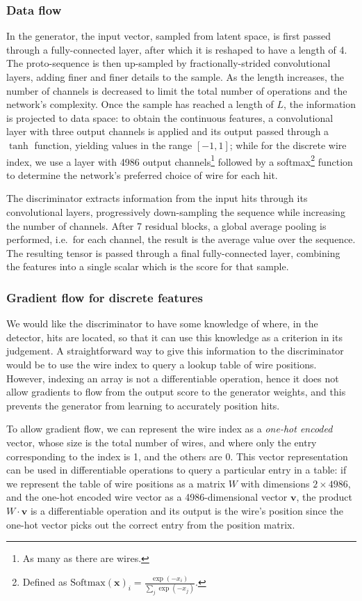 \subsubsection{Data flow}
In the generator, the input vector, sampled from latent space, is first passed
through a fully-connected layer, after which it is reshaped to have a length of
4. The proto-sequence is then up-sampled by fractionally-strided convolutional
layers, adding finer and finer details to the sample. As the length increases,
the number of channels is decreased to limit the total number of operations and
the network's complexity. Once the sample has reached a length of $L$, the
information is projected to data space: to obtain the continuous features, a
convolutional layer with three output channels is applied and its output passed
through a $\tanh$ function, yielding values in the range $[-1, 1]$; while for
the discrete wire index, we use a layer with 4986 output channels\footnote{As
many as there are wires.} followed by a softmax\footnote{Defined as
$\mathrm{Softmax}(\bm{x})_i = \frac{\exp(-x_i)}{\sum_j \exp(-x_j)}.$}
function to determine the network's preferred choice of wire for each hit.

The discriminator extracts information from the input hits through its
convolutional layers, progressively down-sampling the sequence while increasing
the number of channels. After 7 residual blocks, a global average pooling is
performed, i.e.\ for each channel, the result is the average value over the
sequence. The resulting tensor is passed through a final fully-connected layer,
combining the features into a single scalar which is the score for that sample.

\subsubsection{Gradient flow for discrete features}
We would like the discriminator to have some knowledge of where, in the
detector, hits are located, so that it can use this knowledge as a criterion in
its judgement. A straightforward way to give this information to the
discriminator would be to use the wire index to query a lookup table of wire
positions. However, indexing an array is not a differentiable operation, hence
it does not allow gradients to flow from the output score to the generator
weights, and this prevents the generator from learning to accurately position
hits.

To allow gradient flow, we can represent the wire index as a \emph{one-hot
encoded} vector, whose size is the total number of wires, and where only the
entry corresponding to the index is 1, and the others are 0. This vector
representation can be used in differentiable operations to query a particular
entry in a table: if we represent the table of wire positions as a matrix $W$
with dimensions $2 \times 4986$, and the one-hot encoded wire vector as a
4986-dimensional vector $\bm{v}$, the product $W \cdot \bm{v}$ is a
differentiable operation and its output is the wire's position since the one-hot
vector picks out the correct entry from the position matrix.

